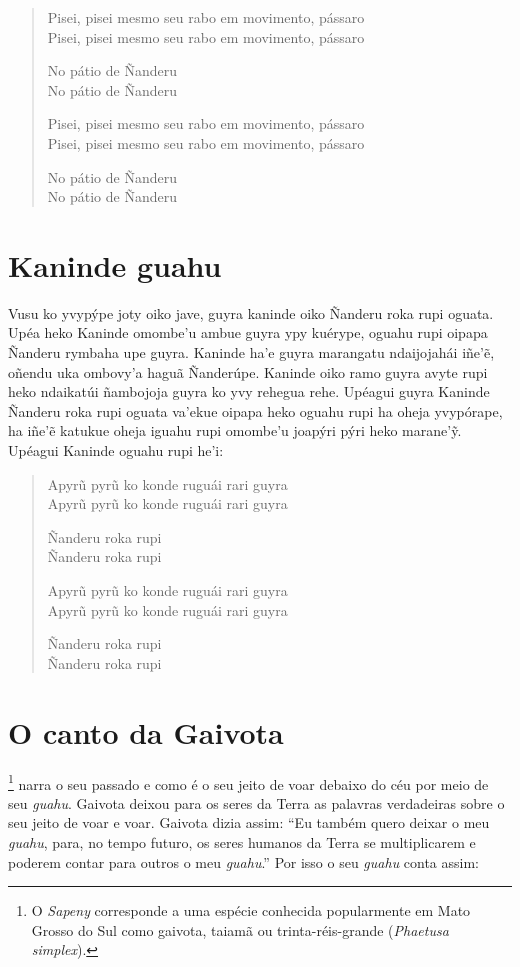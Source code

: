 \begin{verse}
Pisei, pisei mesmo seu rabo em movimento, pássaro\\
Pisei, pisei mesmo seu rabo em movimento, pássaro

No pátio de Ñanderu\\
No pátio de Ñanderu

Pisei, pisei mesmo seu rabo em movimento, pássaro\\
Pisei, pisei mesmo seu rabo em movimento, pássaro

No pátio de Ñanderu\\
No pátio de Ñanderu
\end{verse}

\chapter{Kaninde guahu}

 Vusu ko yvypýpe joty oiko jave, guyra kaninde oiko Ñanderu roka
rupi oguata. Upéa heko Kaninde omombe'u ambue guyra ypy kuérype, oguahu
rupi oipapa Ñanderu rymbaha upe guyra. Kaninde ha'e guyra marangatu
ndaijojahái iñe'ẽ, oñendu uka ombovy'a haguã Ñanderúpe. Kaninde oiko
ramo guyra avyte rupi heko ndaikatúi ñambojoja guyra ko yvy rehegua
rehe. Upéagui guyra Kaninde Ñanderu roka rupi oguata va'ekue oipapa heko
oguahu rupi ha oheja yvypórape, ha iñe'ẽ katukue oheja iguahu rupi
omombe'u joapýri pýri heko marane'ỹ. Upéagui Kaninde oguahu rupi he'i:

\begin{verse}
Apyrũ pyrũ ko konde ruguái rari guyra\\
Apyrũ pyrũ ko konde ruguái rari guyra

Ñanderu roka rupi\\
Ñanderu roka rupi

Apyrũ pyrũ ko konde ruguái rari guyra\\
Apyrũ pyrũ ko konde ruguái rari guyra

Ñanderu roka rupi\\
Ñanderu roka rupi
\end{verse}

\chapter{O canto da Gaivota}

\footnote{O \textit{Sapeny} corresponde a uma espécie conhecida
  popularmente em Mato Grosso do Sul como gaivota, taiamã ou
  trinta-réis-grande (\textit{Phaetusa simplex}).} narra o seu passado e
como é o seu jeito de voar debaixo do céu por meio de seu \textit{guahu}.
Gaivota deixou para os seres da Terra as palavras verdadeiras sobre o
seu jeito de voar e voar. Gaivota dizia assim: ``Eu também quero deixar
o meu \textit{guahu}, para, no tempo futuro, os seres humanos da Terra se
multiplicarem e poderem contar para outros o meu \textit{guahu}.'' Por
isso o seu \textit{guahu} conta assim:

